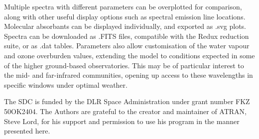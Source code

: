 \documentclass[11pt,twoside]{article}
\begin{document}
Multiple spectra with different parameters can be overplotted for
comparison, along with other useful display options such as spectral emission line locations.
Molecular absorbants can be displayed individually, and exported as .svg plots.
Spectra can be downloaded as .FITS files, compatible with the Redux reduction
suite, or as .dat tables. Parameters also allow customisation of the water vapour and
ozone overburden values, extending the model to conditions expected in some of the
higher ground-based observatories. This may be of particular interest to the mid- and far-infrared
communities, opening up access to these wavelengths in specific windows under optimal weather.


\clearpage

\acknowledgements The SDC is funded by the DLR Space Administration under grant number FKZ 50OK2404.
The Authors are grateful to the creator and maintainer of ATRAN, Steve Lord, for his support and
permission to use his program in the manner presented here.


\end{document}
